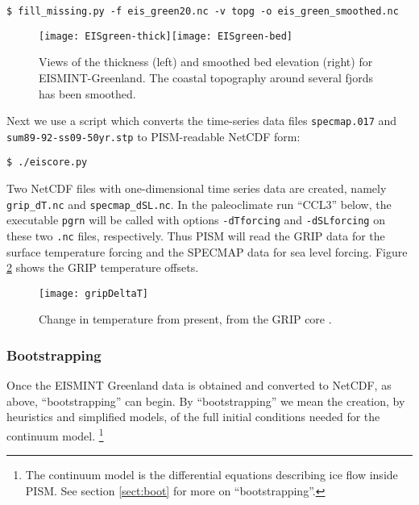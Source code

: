 \begin{verbatim}
$ fill_missing.py -f eis_green20.nc -v topg -o eis_green_smoothed.nc
\end{verbatim}%

\begin{figure}[ht]
\centering
\texttt{[image: EISgreen-thick]}\quad\texttt{[image: EISgreen-bed]}
\caption{Views of the thickness (left) and smoothed bed elevation (right) for EISMINT-Greenland.  The coastal topography around several fjords has been smoothed.}
\label{fig:greendata}
\end{figure}

Next we use a script which converts the time-series data files \texttt{specmap.017} and \texttt{sum89-92-ss09-50yr.stp} to PISM-readable NetCDF form:

\begin{verbatim}
$ ./eiscore.py
\end{verbatim}%

\noindent Two NetCDF files with one-dimensional time series data are created, namely \texttt{grip_dT.nc} and \texttt{specmap_dSL.nc}.  In the paleoclimate run ``CCL3'' below, the executable \texttt{pgrn} will be called with options \texttt{-dTforcing} and \texttt{-dSLforcing} on these two \texttt{.nc} files, respectively.  Thus PISM will read the GRIP data \cite{Dansgaardetal1993} for the surface temperature forcing and the SPECMAP data \cite{Imbrieetal1984} for sea level forcing.  Figure \ref{fig:gripDeltaT} shows the GRIP temperature offsets.

\begin{figure}[ht]
\centering
\texttt{[image: gripDeltaT]}
\caption{Change in temperature from present, from the GRIP core \cite{JohnsenetalGRIP}.}
\label{fig:gripDeltaT}
\end{figure}


\subsubsection*{Bootstrapping}  \label{sect:green-bootstrapping}  Once the EISMINT Greenland data is obtained and converted to NetCDF, as above, ``bootstrapping'' can begin.  By ``bootstrapping'' we mean the creation, by heuristics and simplified models, of the full initial conditions needed for the continuum model.  \footnote{The continuum model is the differential equations describing ice flow inside PISM.  See section \ref{sect:boot} for more on ``bootstrapping''.}

